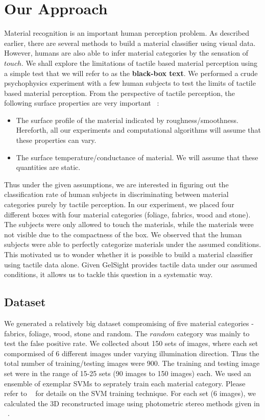 \documentclass[10pt,twocolumn,letterpaper]{article}
\begin{document}
\section{Our Approach}
Material recognition is an important human perception problem. As described earlier, there are several methods to build a material classifier using visual data. However, humans are also able to infer
material categories by the sensation of $touch$. We shall explore the limitations of tactile based material perception using a simple test that we will refer to as the \textbf{black-box text}. 
We performed a crude psychophysics experiment with a few human subjects to test the limits of tactile based material perception. From the perspective of tactile perception, the following surface properties are
very important ~\cite{lisathesis}: 
\begin{itemize}
\item The surface profile of the material indicated by roughness/smoothness. Hereforth, all our experiments and computational algorithms will assume that these properties can vary.
\item The surface temperature/conductance of material. We will assume that these quantities are static. 
\end{itemize}

Thus under the given assumptions, we are interested in figuring out the classification rate of human subjects in discriminating between material categories purely by tactile perception. In our experiment, we placed four
different boxes with four material categories (foliage, fabrics, wood and stone). The subjects were only allowed to touch the materials, while the materials were not visible due to the compactness of the box. We observed that
the human subjects were able to perfectly categorize materials under the assumed conditions. This motivated us to wonder whether it is possible to build a material classifier using tactile data alone. Given GelSight provides 
tactile data under our assumed conditions, it allows us to tackle this question in a systematic way. 

\subsection {Dataset} 
We generated a relatively big dataset compromising of five material categories - fabrics, foliage, wood, stone and random. The $random$ category was mainly to test the false positive rate.
We collected about 150 sets of images, where each set compormised of 6 different images under varying illumination direction. Thus the total number of training/testing images were 900. The training and testing image set
were in the range of 15-25 sets (90 images to 150 images) each. We used an ensemble of exemplar SVMs to seprately train each material category. Please refer to ~\cite{exemplar} for details on the SVM training technique. 
For each set (6 images), we calculated the 3D reconstructed image using photometric stereo methods given in ~\cite{micah}.
\end{document}
